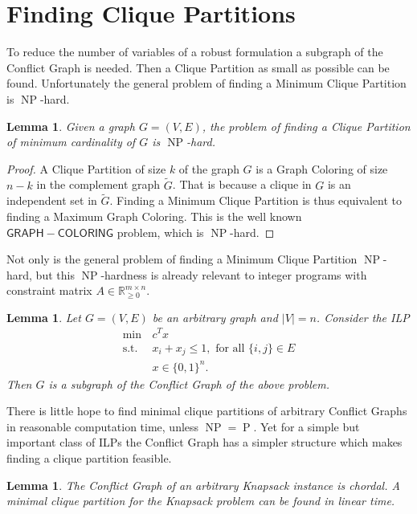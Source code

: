 \documentclass[titlepage, a4paper]{amsbook}
\theoremstyle{plain}
\newtheorem{lem}[thm]{Lemma}
\theoremstyle{break}
\theoremstyle{definition}
\theoremstyle{remark}
\numberwithin{equation}{thm}
\DeclareMathOperator{\NP}{NP}
\DeclareMathOperator{\PP}{P}
\begin{document}
\section{Finding Clique Partitions}
To reduce the number of variables of a robust formulation a subgraph of the Conflict Graph is needed. Then a Clique Partition as small as possible can be found. Unfortunately the general problem of finding a Minimum Clique Partition is $\NP$-hard.
\begin{lem}
Given a graph $G=(V,E)$, the problem of finding a Clique Partition of minimum cardinality of $G$ is $\NP$-hard.
\end{lem}
\begin{proof}
A Clique Partition of size $k$ of the graph $G$ is a Graph Coloring of size $n-k$ in the complement graph $\widetilde{G}$. That is because a clique in $G$ is an independent set in $\widetilde{G}$.
Finding a Minimum Clique Partition is thus equivalent to finding a Maximum Graph Coloring. This is the well known $\mathsf{GRAPH-COLORING}$ problem, which is $\NP$-hard.
\end{proof}
Not only is the general problem of finding a Minimum Clique Partition $\NP$-hard, but this $\NP$-hardness is already relevant to integer programs with constraint matrix $A \in \mathbb{R}_{\geq 0}^{m \times n}$.
\begin{lem}
Let $G=(V,E)$ be an arbitrary graph and $\vert V \vert=n$. Consider the ILP
\begin{equation*}
\begin{split}
    \min\, &c^Tx\\
    \text{s.t. } &x_i + x_j \leq 1,\text{ for all }\{i,j\} \in E \\
    &x \in \{0,1\}^n.
\end{split}
\end{equation*}
Then $G$ is a subgraph of the Conflict Graph of the above problem.
\end{lem}
There is little hope to find minimal clique partitions of arbitrary Conflict Graphs in reasonable computation time, unless $\NP=\PP$.
Yet for a simple but important class of ILPs the Conflict Graph has a simpler structure which makes finding a clique partition feasible.
\begin{lem}
The Conflict Graph of an arbitrary Knapsack instance is chordal. 
A minimal clique partition for the Knapsack problem can be found in
linear time.
\end{lem}
\end{document}
